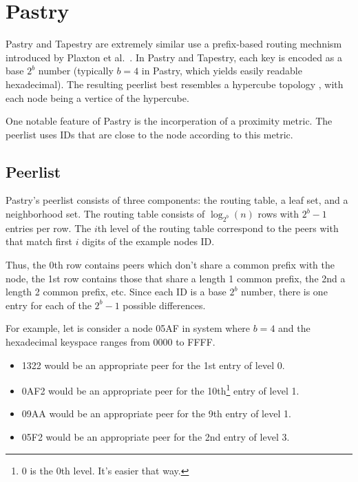 \section{Pastry}

Pastry \cite{pastry} and Tapestry \cite{tapestry} are extremely similar use a prefix-based routing mechnism introduced by Plaxton et al.\ \cite{plaxton1999accessing}.
In Pastry and Tapestry, each key is encoded as a base $ 2^{b} $ number (typically $b=4$ in Pastry, which yields easily readable hexadecimal).
The resulting peerlist best resembles a hypercube topology \cite{induced}, with each node being a vertice of the hypercube.

One notable feature of Pastry is the incorperation of a proximity metric.
The peerlist uses IDs that are close to the node according to this metric.

\subsection*{Peerlist}
Pastry's peerlist consists of three components: the routing table, a leaf set, and a neighborhood set.  
The routing table consists of $\log_{2^{b}}(n)$ rows with $2^{b} -1 $ entries per row. 
The $i$th level of the routing table correspond to the peers with that match first $i$ digits of the example nodes ID.

Thus, the 0th row contains peers which don't share a common prefix with the node, the 1st row contains those that share a length 1 common prefix, the 2nd a length 2 common prefix, etc.  
Since each ID is a base $2^b$ number, there is one entry for each of the $2^{b} -1 $ possible differences.   

For example, let is consider a node 05AF in system where $b = 4$ and the hexadecimal keyspace ranges from $0000$ to FFFF.
\begin{itemize}
    \item 1322 would be an appropriate peer for the 1st entry of level 0.
    \item 0AF2 would be an appropriate peer for the 10th\footnote{0 is the 0th level.  It's easier that way.} entry of level 1.
    \item 09AA would be an appropriate peer for the 9th entry of level 1.	
    \item 05F2 would be an appropriate peer for the 2nd entry of level 3.
\end{itemize}


